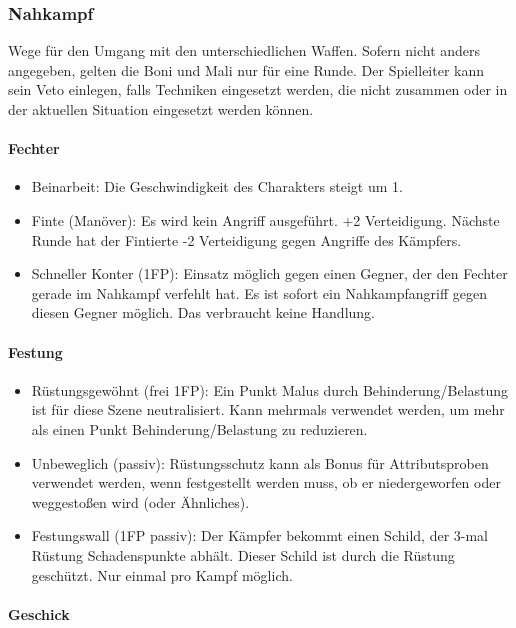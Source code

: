 \documentclass{article}
\begin{document}
\subsubsection{Nahkampf}

Wege für den Umgang mit den unterschiedlichen Waffen. Sofern nicht anders angegeben, gelten die Boni und Mali nur für
eine Runde. Der Spielleiter kann sein Veto einlegen, falls Techniken eingesetzt werden, die nicht zusammen oder in
der aktuellen Situation eingesetzt werden können.

\paragraph{Fechter}

\begin{itemize}
\item Beinarbeit: Die Geschwindigkeit des Charakters steigt um 1.
\item Finte (Manöver): Es wird kein Angriff ausgeführt. +2 Verteidigung. Nächste Runde hat der Fintierte -2 Verteidigung gegen Angriffe des Kämpfers.
\item Schneller Konter (1FP): Einsatz möglich gegen einen Gegner, der den Fechter gerade im Nahkampf verfehlt hat. Es ist sofort ein Nahkampfangriff gegen diesen Gegner möglich. Das verbraucht keine Handlung.
\end{itemize}

\paragraph{Festung}

\begin{itemize}
\item Rüstungsgewöhnt (frei 1FP): Ein Punkt Malus durch Behinderung/Belastung ist für diese Szene neutralisiert. Kann mehrmals verwendet werden, um mehr als einen Punkt Behinderung/Belastung zu reduzieren.
\item Unbeweglich (passiv): Rüstungsschutz kann als Bonus für Attributsproben verwendet werden, wenn festgestellt werden muss, ob er niedergeworfen oder weggestoßen wird (oder Ähnliches).
\item Festungswall (1FP passiv): Der Kämpfer bekommt einen Schild, der 3-mal Rüstung Schadenspunkte abhält. Dieser Schild ist durch die Rüstung geschützt. Nur einmal pro Kampf möglich.
\end{itemize}

\paragraph{Geschick}
\end{document}
